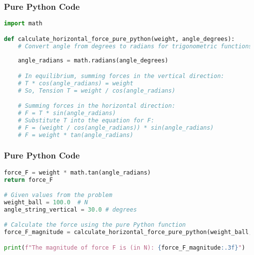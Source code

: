 \documentclass{beamer}
\begin{document}
\begin{frame}[fragile]
\frametitle{Pure Python Code}
\begin{lstlisting}[language=Python]
import math

def calculate_horizontal_force_pure_python(weight, angle_degrees):
    # Convert angle from degrees to radians for trigonometric functions
    
    angle_radians = math.radians(angle_degrees)

    # In equilibrium, summing forces in the vertical direction:
    # T * cos(angle_radians) = weight
    # So, Tension T = weight / cos(angle_radians)

    # Summing forces in the horizontal direction:
    # F = T * sin(angle_radians)
    # Substitute T into the equation for F:
    # F = (weight / cos(angle_radians)) * sin(angle_radians)
    # F = weight * tan(angle_radians)
\end{lstlisting}
\end{frame}

\begin{frame}[fragile]
\frametitle{Pure Python Code}
\begin{lstlisting}[language=Python]
force_F = weight * math.tan(angle_radians)
return force_F

# Given values from the problem
weight_ball = 100.0  # N
angle_string_vertical = 30.0 # degrees

# Calculate the force using the pure Python function
force_F_magnitude = calculate_horizontal_force_pure_python(weight_ball, angle_string_vertical)

print(f"The magnitude of force F is (in N): {force_F_magnitude:.3f}")
\end{lstlisting}
\end{frame}
\end{document}
